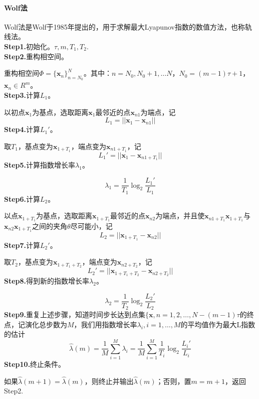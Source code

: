             \paragraph{Wolf法}
            Wolf法是Wolf于1985年提出的，用于求解最大Lyapunov指数的数值方法，也称轨线法。\\
            \textbf{Step1.}初始化。$\tau ,m, T_1, T_2$.\\
            \textbf{Step2.}重构相空间。\par
            重构相空间$\Phi = \{\mathbf{x}_n\}_{n=N_0}^N$。其中：$n = N_0,N_0+1,\dots N$，$N_0 = (m-1) \tau + 1$，$\mathbf{x}_n \in R^m$。\\
            \textbf{Step3.}计算$L_1$。\par
            以初点$\mathbf{x}_1$为基点，选取距离$\mathbf{x}_1$最邻近的点$\mathbf{x}_{n1}$为端点，记
            \[
                L_1 = ||\mathbf{x}_1 - \mathbf{x}_{n1}||
            \]
            \textbf{Step4.}计算$L_1'$。\par
            取$T_1$，基点变为$\mathbf{x}_{1 + T_1}$，端点变为$\mathbf{x}_{n1 + T_1}$，记
            \[
                L_1' = ||\mathbf{x}_1 - \mathbf{x}_{n1 + T_1}||
            \]
            \textbf{Step5.}计算指数增长率$\lambda _1$。\par
            \[
                \lambda _1 = \frac{1}{T_1} \log_2 \frac{L_1'}{L_1}
            \]
            \textbf{Step6.}计算$L_2$。\par
            以点$\mathbf{x}_{1+T_1}$为基点，选取距离$\mathbf{x}_{1+T_1}$最邻近的点$\mathbf{x}_{n2}$为端点，并且使$\mathbf{x}_{n1 + T_1} \mathbf{x}_{1 + T_1}$与$\mathbf{x}_{n2} \mathbf{x}_{1 + T_1}$之间的夹角$\theta $尽可能小，记
            \[
                L_2 = ||\mathbf{x}_{1+T_1} - \mathbf{x}_{n2}||
            \]
            \textbf{Step7.}计算$L_2'$。\par
            取$T_2$，基点变为$\mathbf{x}_{1 + T_1 + T_2}$，端点变为$\mathbf{x}_{n2 + T_2}$，记
            \[
                L_2' = ||\mathbf{x}_{1 + T_1 + T_2} - \mathbf{x}_{n2 + T_2}||
            \]
            \textbf{Step8.}得到新的指数增长率$\lambda _2$。\par
            \[
                \lambda _2 = \frac{1}{T_2} \log_2 \frac{L_2'}{L_2}
            \]
            \textbf{Step9.}重复上述步骤，知道时间步长达到点集$\{\mathbf{x},n = 1,2,\dots,N - (m-1)\tau$的终点，记演化总步数为$M$，我们用指数增长率$\lambda _i,i = 1,\dots ,M$的平均值作为最大L指数的估计
            \[
                \hat{\lambda}(m) = \frac{1}{M} \sum_{i = 1}^M \lambda_i = \frac{1}{M} \sum_{i = 1}^M \frac{1}{T_i}\log_2 \frac{L_i'}{L_i}
            \]
            \textbf{Step10.}终止条件。\par
            如果$\hat{\lambda}(m+1) = \hat{\lambda}(m)$，则终止并输出$\hat{\lambda}(m)$；否则，置$m = m+1$，返回Step2.
